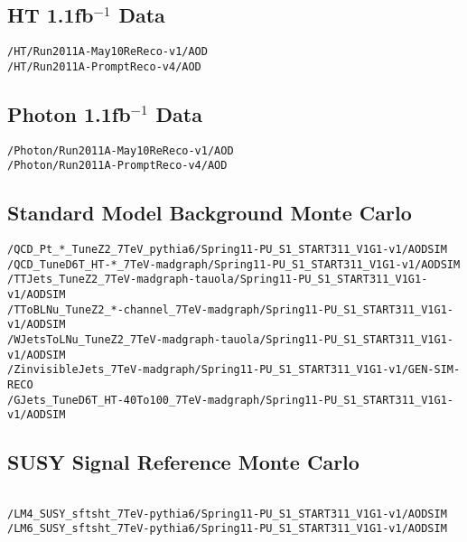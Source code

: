 \chapter{}
\section*{HT 1.1fb$^{-1}$ Data}
\begin{verbatim}
/HT/Run2011A-May10ReReco-v1/AOD
/HT/Run2011A-PromptReco-v4/AOD
\end{verbatim}
\section*{Photon 1.1fb$^{-1}$ Data}
\begin{verbatim}
/Photon/Run2011A-May10ReReco-v1/AOD
/Photon/Run2011A-PromptReco-v4/AOD
\end{verbatim}
\section*{Standard Model Background Monte Carlo}
\fontsize{10}{12}
\begin{verbatim}
/QCD_Pt_*_TuneZ2_7TeV_pythia6/Spring11-PU_S1_START311_V1G1-v1/AODSIM
/QCD_TuneD6T_HT-*_7TeV-madgraph/Spring11-PU_S1_START311_V1G1-v1/AODSIM
/TTJets_TuneZ2_7TeV-madgraph-tauola/Spring11-PU_S1_START311_V1G1-v1/AODSIM
/TToBLNu_TuneZ2_*-channel_7TeV-madgraph/Spring11-PU_S1_START311_V1G1-v1/AODSIM
/WJetsToLNu_TuneZ2_7TeV-madgraph-tauola/Spring11-PU_S1_START311_V1G1-v1/AODSIM
/ZinvisibleJets_7TeV-madgraph/Spring11-PU_S1_START311_V1G1-v1/GEN-SIM-RECO
/GJets_TuneD6T_HT-40To100_7TeV-madgraph/Spring11-PU_S1_START311_V1G1-v1/AODSIM

\end{verbatim}
\normalsize
\section*{SUSY Signal Reference Monte Carlo}
\fontsize{10}{12}
\begin{verbatim}

/LM4_SUSY_sftsht_7TeV-pythia6/Spring11-PU_S1_START311_V1G1-v1/AODSIM
/LM6_SUSY_sftsht_7TeV-pythia6/Spring11-PU_S1_START311_V1G1-v1/AODSIM
\end{verbatim}
\normalsize

